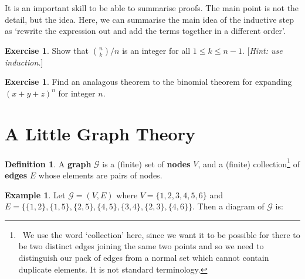 \documentclass[a4paper]{amsart}
\theoremstyle{definition}
\newtheorem{defn}[thm]{Definition}
\newtheorem{ex}[thm]{Example}
\newtheorem{exercise}[thm]{Exercise}
\theoremstyle{remark}
\begin{document}
It is an important skill to be able to summarise proofs. The main point is not the detail, but the idea. Here, we can summarise
the main idea of the inductive step as `rewrite the expression out and add the terms together in a different order'.

\begin{exercise}
  Show that $ \binom{n}{k}/n $ is an integer for all $ 1 \leq k \leq n - 1 $. [\emph{Hint: use induction.}]
\end{exercise}

\begin{exercise}
  Find an analagous theorem to the binomial theorem for expanding $ (x + y + z)^n $ for integer $ n $.
\end{exercise}

\section{A Little Graph Theory}
\begin{defn}
  A \textbf{graph} $ \mathcal{G} $ is a (finite) set of \textbf{nodes} $ V $, and a (finite) collection\footnote{~We use the word `collection'
  here, since we want it to be possible for there to be two distinct edges joining the same two points and so we need to distinguish our pack
  of edges from a normal set which cannot contain duplicate elements. It is not standard terminology.} of \textbf{edges} $ E $ whose
  elements are pairs of nodes.
\end{defn}

\begin{ex}\label{ex:graphg}
  Let $ \mathcal{G} = (V, E) $ where $ V = \{1, 2, 3, 4, 5, 6\} $ and $ E = \{\{1, 2\},\allowbreak \{1, 5\},\allowbreak \{2, 5\},\allowbreak
  \{4, 5\},\allowbreak \{3, 4\},\allowbreak \{2, 3\},\allowbreak \{4,6\}\} $. Then a diagram of $ \mathcal{G} $ is:
  \begin{center}
  \end{center}
\end{ex}
\end{document}
